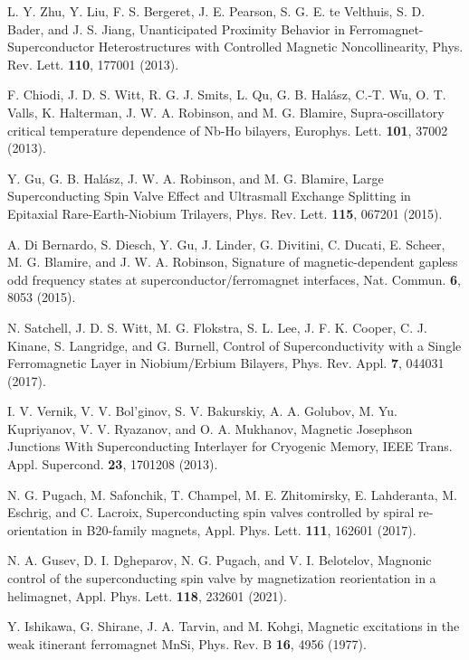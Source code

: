 \documentclass[prb,amsmath,amssymb,reprint]{revtex4-2}
\begin{document}
\begin{thebibliography}{99}
  L. Y. Zhu, Y. Liu, F. S. Bergeret, J. E. Pearson, S. G.
E. te Velthuis, S. D. Bader, and J. S. Jiang,
Unanticipated Proximity Behavior in Ferromagnet-Superconductor Heterostructures with Controlled Magnetic Noncollinearity,
Phys. Rev. Lett. \textbf{110},
177001 (2013).

 F. Chiodi, J. D. S. Witt, R. G. J. Smits, L. Qu, G. B.
Hal\'{a}sz, C.-T. Wu, O. T. Valls, K. Halterman, J. W. A. Robinson, and M.
G. Blamire,
Supra-oscillatory critical temperature dependence of Nb-Ho bilayers,
Europhys. Lett. \textbf{101}, 37002 (2013).

 Y. Gu, G. B. Hal\'{a}sz, J. W. A. Robinson, and M. G.
Blamire,
Large Superconducting Spin Valve Effect and Ultrasmall Exchange Splitting in Epitaxial Rare-Earth-Niobium Trilayers,
Phys. Rev. Lett. \textbf{115}, 067201 (2015).

 A. Di Bernardo, S. Diesch, Y. Gu, J. Linder, G.
Divitini, C. Ducati, E. Scheer, M. G. Blamire, and J. W. A. Robinson,
Signature of magnetic-dependent gapless odd frequency states at superconductor/ferromagnet interfaces,
Nat.
Commun. \textbf{6}, 8053 (2015).

  N. Satchell, J. D. S. Witt, M. G. Flokstra, S. L.
Lee, J. F. K. Cooper, C. J. Kinane, S. Langridge, and G. Burnell,
Control of Superconductivity with a Single Ferromagnetic Layer in Niobium/Erbium Bilayers,
Phys. Rev.
Appl. \textbf{7}, 044031 (2017).

 I. V. Vernik, V. V. Bol'ginov, S. V. Bakurskiy, A. A.
Golubov, M. Yu. Kupriyanov, V. V. Ryazanov, and O. A. Mukhanov,
Magnetic Josephson Junctions With Superconducting Interlayer for Cryogenic Memory,
 IEEE Trans.
Appl. Supercond. \textbf{23}, 1701208 (2013).

 N. G. Pugach, M. Safonchik, T. Champel, M. E.
Zhitomirsky, E. Lahderanta, M. Eschrig, and C. Lacroix,
Superconducting spin valves controlled by spiral re-orientation in B20-family magnets,
Appl. Phys. Lett.
\textbf{111}, 162601 (2017).

 N. A. Gusev, D. I. Dgheparov, N. G. Pugach, and V. I. Belotelov,
Magnonic control of the superconducting spin valve by magnetization reorientation in a helimagnet,
Appl. Phys. Lett. \textbf{118}, 232601 (2021).

 Y. Ishikawa, G. Shirane, J. A. Tarvin, and M. Kohgi,
Magnetic excitations in the weak itinerant ferromagnet MnSi,
Phys. Rev. B \textbf{16}, 4956 (1977).


\end{thebibliography}
\end{document}
